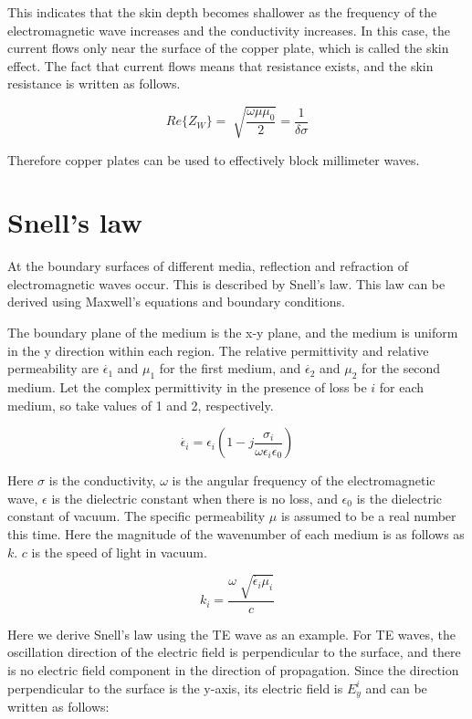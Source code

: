 \documentclass[a4paper,11pt]{jsarticle}
\begin{document}
This indicates that the skin depth becomes shallower
as the frequency of the electromagnetic wave increases and the conductivity increases.
In this case, the current flows only near the surface of the copper plate,
which is called the skin effect.
The fact that current flows means that resistance exists,
and the skin resistance is written as follows.

\begin{equation}
  Re\{Z_W\} = \sqrt[]{\frac{\omega\mu\mu_0}{2}} = \frac{1}{\delta\sigma}
\end{equation}

Therefore copper plates can be used to effectively block millimeter waves.

\section{Snell's law}

At the boundary surfaces of different media, reflection and refraction of electromagnetic waves occur.
This is described by Snell's law.
This law can be derived using Maxwell's equations and boundary conditions.

The boundary plane of the medium is the x-y plane,
and the medium is uniform in the y direction within each region.
The relative permittivity and relative permeability are
$\dot{\epsilon_1}$ and $\mu_1$ for the first medium, and
$\dot{\epsilon_2}$ and $\mu_2$ for the second medium.
Let the complex permittivity in the presence of loss be
$i$ for each medium, so take values of 1 and 2, respectively.


\begin{equation}
  \dot{\epsilon_i} = \epsilon_i(1 - j\frac{\sigma_i}{\omega\epsilon_i\epsilon_0})
\end{equation}

Here $\sigma$ is the conductivity,
$\omega$ is the angular frequency of the electromagnetic wave,
$\epsilon$ is the dielectric constant when there is no loss, and
$\epsilon_0$ is the dielectric constant of vacuum.
The specific permeability $\mu$ is assumed to be a real number this time.
Here the magnitude of the wavenumber of each medium is as follows as $k$.
$c$ is the speed of light in vacuum.

\begin{equation}
  k_i = \frac{\omega\sqrt[]{\dot{\epsilon_i}\mu_i}}{c}
\end{equation}

Here we derive Snell's law using the TE wave as an example.
For TE waves,
the oscillation direction of the electric field is perpendicular to the surface,
and there is no electric field component in the direction of propagation.
Since the direction perpendicular to the surface is the y-axis,
its electric field is $E^i_y$ and can be written as follows:
\end{document}
